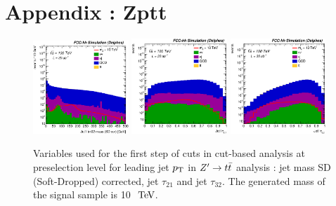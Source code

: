 \documentclass{cernrep}
\begin{document}
\clearpage
\newpage

\section{Appendix : Zptt}
\label{appendix:zptt}


\begin{figure}[!htb]\centering
\includegraphics[width=0.32\textwidth]{Fig/Zptt/Jet1_trk02_SD_Cor_m_sel0_nostack_log.eps}
\includegraphics[width=0.32\textwidth]{Fig/Zptt/Jet1_tau21_sel0_nostack_log.eps}
\includegraphics[width=0.32\textwidth]{Fig/Zptt/Jet1_tau32_sel0_nostack_log.eps}
\caption{Variables used for the first step of cuts in cut-based analysis at preselection level for leading jet $p\sb{\scriptstyle\mathrm{T}}$ in $Z^{\prime} \rightarrow t\bar{t}$ analysis : jet mass SD (Soft-Dropped) corrected, jet $\tau_{21}$ and jet $\tau_{32}$. The generated mass of the signal sample is 10 $\TeV$.}
\label{fig:Zptt_sel0_cut}
\end{figure}
\end{document}
